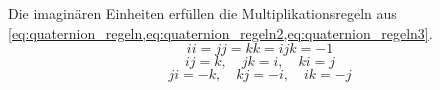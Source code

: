 %
%
%
%
%
%
%
%
%
%



Die imaginären Einheiten erfüllen die Multiplikationsregeln aus \cref{eq:quaternion_regeln,eq:quaternion_regeln2,eq:quaternion_regeln3}.
\begin{equation}
ii = jj = kk = ijk = -1
\label{eq:quaternion_regeln}
\end{equation}
\begin{equation}
ij = k , \quad jk = i , \quad ki = j
\label{eq:quaternion_regeln2}
\end{equation}
\begin{equation}
ji = -k , \quad kj = -i , \quad ik = -j
\label{eq:quaternion_regeln3}
\end{equation}

